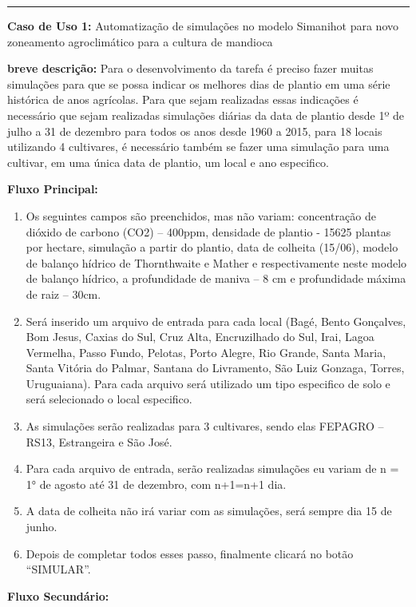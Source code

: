 \documentclass[12pt]{article}
\begin{document}

	\hrule \bigskip

	{\bf Caso de Uso 1:} Automatização de simulações no modelo Simanihot para novo zoneamento agroclimático para a cultura de mandioca 
	\bigskip
	
	{\bf breve descrição:} Para o desenvolvimento da tarefa é preciso fazer muitas simulações para que se possa indicar os melhores dias de plantio em uma série histórica de anos agrícolas. Para que sejam realizadas essas indicações é necessário que sejam realizadas simulações diárias da data de plantio desde 1º de julho a 31 de dezembro para todos os anos desde 1960 a 2015, para 18 locais utilizando 4 cultivares, é necessário também se fazer uma simulação para uma cultivar, em uma única data de plantio, um local e ano especifico. 
	\bigskip
	
	{\bf Fluxo Principal:}
	
	\begin{enumerate}
		\item Os seguintes campos são preenchidos, mas não variam: concentração de dióxido de carbono (CO2) – 400ppm, densidade de plantio - 15625 plantas por hectare, simulação a partir do plantio, data de colheita (15/06), modelo de balanço hídrico de Thornthwaite e Mather e respectivamente neste modelo de balanço hídrico, a profundidade de maniva – 8 cm e profundidade máxima de raiz – 30cm.
		\item Será inserido um arquivo de entrada para cada local (Bagé, Bento Gonçalves, Bom Jesus, Caxias do Sul, Cruz Alta, Encruzilhado do Sul, Irai, Lagoa Vermelha, Passo Fundo, Pelotas, Porto Alegre, Rio Grande, Santa Maria, Santa Vitória do Palmar, Santana do Livramento, São Luiz Gonzaga, Torres, Uruguaiana). Para cada arquivo será utilizado um tipo especifico de solo e será selecionado o local especifico.
		\item As simulações serão realizadas para 3 cultivares, sendo elas FEPAGRO – RS13, Estrangeira e São José. 
		\item Para cada arquivo de entrada, serão realizadas simulações eu variam de n = 1° de agosto até 31 de dezembro, com n+1=n+1 dia.
		\item A data de colheita não irá variar com as simulações, será sempre dia 15 de junho.
		\item Depois de completar todos esses passo, finalmente clicará no botão “SIMULAR”. 
	\end{enumerate}
	
	{\bf Fluxo Secundário:}
	
\end{document}
